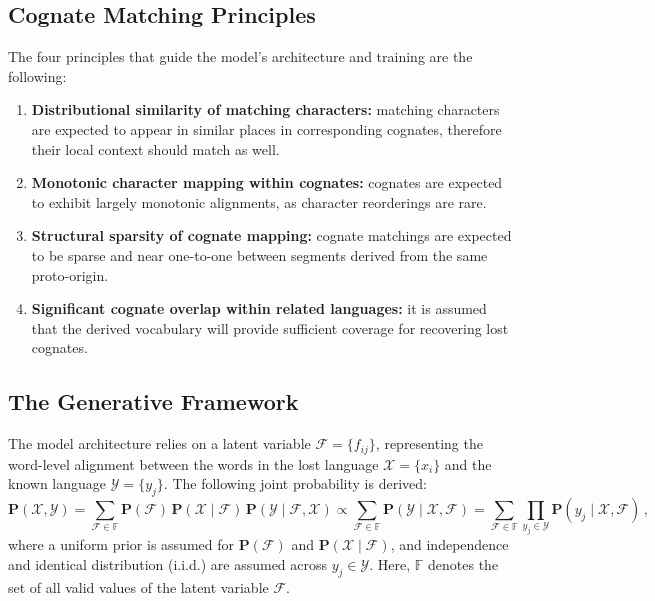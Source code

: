 \subsection{Cognate Matching Principles}
The four principles that guide the model's architecture and training are the following:
\begin{enumerate}[leftmargin=2em, label=\textbf{\arabic*.}]
    \item \textbf{Distributional similarity of matching characters:}
    matching characters are expected to appear in similar places in corresponding cognates, therefore their local context should match as well.

    \item \textbf{Monotonic character mapping within cognates:}
    cognates are expected to exhibit largely monotonic alignments, as character reorderings are rare.

    \item \textbf{Structural sparsity of cognate mapping:}
    cognate matchings are expected to be sparse and near one-to-one between segments derived from the same proto-origin.

    \item \textbf{Significant cognate overlap within related languages:}
    it is assumed that the derived vocabulary will provide sufficient coverage for recovering lost cognates.
\end{enumerate}

\subsection{The Generative Framework} \label{sec:generative-framework}
The model architecture relies on a latent variable $\mathcal{F}=\{f_{ij}\}$, representing the word-level alignment between the words in the lost language $\mathcal{X}=\{x_i\}$ and the known language $\mathcal{Y}=\{y_j\}$.
The following joint probability is derived:
\[
\mathbf{P}(\mathcal{X}, \mathcal{Y})
= \sum_{\mathcal{F}\in \mathbb{F}}
  \mathbf{P}(\mathcal{F})\,\mathbf{P}(\mathcal{X}\mid \mathcal{F})\,\mathbf{P}(\mathcal{Y}\mid \mathcal{F}, \mathcal{X})
\propto
\sum_{\mathcal{F}\in \mathbb{F}}
  \mathbf{P}(\mathcal{Y}\mid \mathcal{X}, \mathcal{F})
=
\sum_{\mathcal{F}\in \mathbb{F}}
  \prod_{y_j\in \mathcal{Y}}
  \mathbf{P}(y_j \mid \mathcal{X}, \mathcal{F}) \, ,
\]
where a uniform prior is assumed for $\mathbf{P}(\mathcal{F})$ and $\mathbf{P}(\mathcal{X}\mid \mathcal{F})$, and independence and identical distribution (i.i.d.) are assumed across $y_j\in\mathcal{Y}$.
Here, $\mathbb{F}$ denotes the set of all valid values of the latent variable $\mathcal{F}$.

